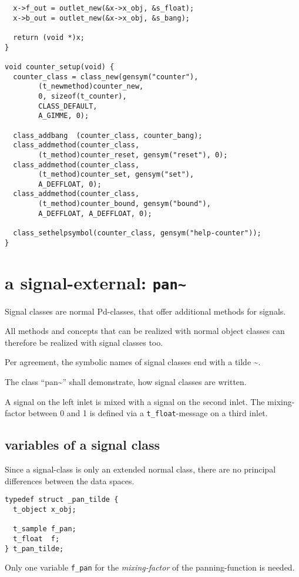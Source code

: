 \documentclass[12pt, a4paper,english,titlepage]{article}
\begin{document}
\begin{verbatim}
  x->f_out = outlet_new(&x->x_obj, &s_float);
  x->b_out = outlet_new(&x->x_obj, &s_bang);

  return (void *)x;
}

void counter_setup(void) {
  counter_class = class_new(gensym("counter"),
        (t_newmethod)counter_new,
        0, sizeof(t_counter),
        CLASS_DEFAULT, 
        A_GIMME, 0);

  class_addbang  (counter_class, counter_bang);
  class_addmethod(counter_class,
        (t_method)counter_reset, gensym("reset"), 0);
  class_addmethod(counter_class, 
        (t_method)counter_set, gensym("set"),
        A_DEFFLOAT, 0);
  class_addmethod(counter_class,
        (t_method)counter_bound, gensym("bound"),
        A_DEFFLOAT, A_DEFFLOAT, 0);

  class_sethelpsymbol(counter_class, gensym("help-counter"));
}
\end{verbatim}


\section{a signal-external: {\tt pan\~\/}}
Signal classes are normal Pd-classes, that offer additional methods for signals.


All methods and concepts that can be realized with normal object classes can
therefore be realized with signal classes too.

Per agreement, the symbolic names of signal classes end with a tilde \~\/.

The class ``pan\~\/'' shall demonstrate, how signal classes are written.

A signal on the left inlet is mixed with a signal on the second inlet.
The mixing-factor between 0 and 1 is defined via a \verb+t_float+-message
on a third inlet.

\subsection{variables of a signal class}
Since a signal-class is only an extended normal class,
there are no principal differences between the data spaces.

\begin{verbatim}
typedef struct _pan_tilde {
  t_object x_obj;

  t_sample f_pan;
  t_float  f;
} t_pan_tilde;
\end{verbatim}

Only one variable \verb+f_pan+ for the {\em mixing-factor} of the panning-function is needed.
\end{document}
